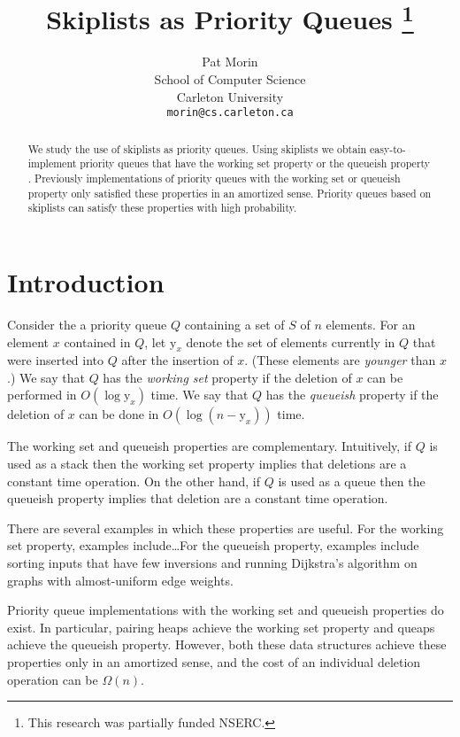 \documentclass{article}
\title{Skiplists as Priority Queues%
	\thanks{This research was partially funded NSERC.}}
\author{Pat Morin \\ 
	School of Computer Science \\ 
	Carleton University \\ 
	\texttt{morin@cs.carleton.ca}}
\date{}
\newcommand{\y}{\mathrm{y}}
\begin{document}
\maketitle
\begin{abstract}
We study the use of skiplists as priority queues.  Using skiplists we
obtain easy-to-implement priority queues that have the working set
property \cite{st85} or the queueish property \cite{il02}.  Previously
implementations of priority queues with the working set or queueish
property only satisfied these properties in an amortized sense.
Priority queues based on skiplists can satisfy these properties with
high probability.
\end{abstract}

\section{Introduction}

Consider the a priority queue $Q$ containing a set of $S$ of $n$
elements.  For an element $x$ contained in $Q$, let $\y_x$ denote the
set of elements currently in $Q$ that were inserted into $Q$ after the
insertion of $x$.  (These elements are \emph{younger} than $x$.)  We
say that $Q$ has the \emph{working set} property if the deletion of
$x$ can be performed in $O(\log \y_x)$ time.  We say that $Q$ has the
\emph{queueish} property if the deletion of $x$ can be done in $O(\log
(n-\y_x))$ time.

The working set and queueish properties are complementary.
Intuitively, if $Q$ is used as a stack then the working set property
implies that deletions are a constant time operation.  On the other
hand, if $Q$ is used as a queue then the queueish property implies
that deletion are a constant time operation.

There are several examples in which these properties are useful.  For
the working set property, examples include\ldots For the queueish
property, examples include sorting inputs that have few inversions and
running Dijkstra's algorithm on graphs with almost-uniform edge
weights.

Priority queue implementations with the working set and queueish
properties do exist.  In particular, pairing heaps \cite{fsst86} achieve
the working set property and queaps \cite{il02} achieve the queueish
property.  However, both these data structures achieve these
properties only in an amortized sense, and the cost of an individual
deletion operation can be $\Omega(n)$.
\end{document}
